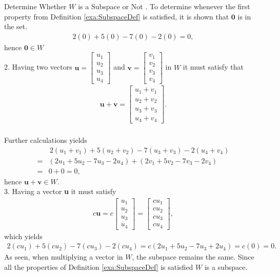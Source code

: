 \begin{example}{Determine Whether $W$ is a Subspace or Not}
. To determine whenever the first property from Definition \ref{exa:SubspaceDef} is satisfied, it is shown that $\textbf{0}$ is in the set.
\begin{align*}
    2(0) + 5(0) - 7(0) -2(0) = 0,
\end{align*}
hence $\textbf{0}\in W$\\
2. Having two vectors $\textbf{u}=\begin{bmatrix}
    u_1\\u_2\\u_3\\u_4\end{bmatrix}$ and $\textbf{v}=\begin{bmatrix}
    v_1\\v_2\\v_3\\v_4\end{bmatrix}$ in $W$ it must satisfy that 
    \begin{align*}
        \textbf{u}+\textbf{v} =
        \begin{bmatrix}
         u_1 + v_1 \\ u_2 + v_2 \\ u_3 + v_3 \\ u_4 + v_4
        \end{bmatrix}.  
    \end{align*}\\
    Further calculations yields
    \begin{align*}
        &\,2(u_1+v_1)+5(u_2+v_2)-7(u_3+v_3)-2(u_4+v_4)\\
        =& (2u_1+5u_2-7u_3-2u_4)+(2v_1+5v_2-7v_3-2v_4)\\ =& 0 + 0 = 0,
    \end{align*}
    hence $\textbf{u}+\textbf{v}\in W$.\\ 
3. Having a vector \textbf{u} it must satisfy 
    \begin{align*}
        c\textbf{u}=c\begin{bmatrix}
        u_1\\u_2\\u_3\\u_4\end{bmatrix}=
        \begin{bmatrix}
        cu_1\\cu_2\\cu_3\\cu_4\end{bmatrix},
    \end{align*}
    which yields
    \begin{align*}
       2(cu_1)+5(cu_2)-7(cu_3)-2(cu_4)=c(2u_1+5u_2-7u_3+2u_4)= c(0) = 0.
    \end{align*}
    As seen, when multiplying a vector in $W$, the subspace remains the same. Since all the properties of Definition \ref{exa:SubspaceDef} is satisfied $W$ is a subspace.
\end{example}
